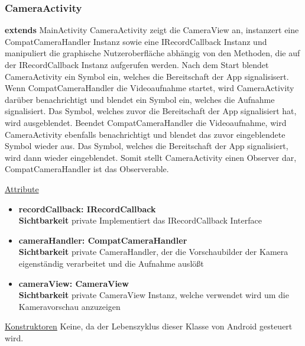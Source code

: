 \subsubsection{CameraActivity}
\textbf{extends} MainActivity \newline
CameraActivity zeigt die CameraView an, instanzert eine CompatCameraHandler Instanz sowie eine IRecordCallback Instanz und manipuliert die graphische Nutzeroberfläche abhängig von den Methoden, die auf der IRecordCallback Instanz aufgerufen werden. Nach dem Start blendet CameraActivity ein Symbol ein, welches die Bereitschaft der App signalisisert. Wenn CompatCameraHandler die Videoaufnahme startet, wird CameraActivity darüber benachrichtigt und blendet ein Symbol ein, welches die Aufnahme signalisiert. Das Symbol, welches zuvor die Bereitschaft der App signalisiert hat, wird ausgeblendet. Beendet CompatCameraHandler die Videoaufnahme, wird CameraActivity ebenfalls benachrichtigt und blendet das zuvor eingeblendete Symbol wieder aus. Das Symbol, welches die Bereitschaft der App signalisiert, wird dann wieder eingeblendet. Somit stellt CameraActivity einen Observer dar, CompatCameraHandler ist das Observerable.
\newline

\underline{Attribute}
\begin{itemize}
\itemsep0pt
\item \textbf{recordCallback: IRecordCallback} \hfill\\ 
\textbf{Sichtbarkeit} private\newline
Implementiert das IRecordCallback Interface

\item \textbf{cameraHandler: CompatCameraHandler} \hfill\\ 
\textbf{Sichtbarkeit} private\newline
CameraHandler, der die Vorschaubilder der Kamera eigenständig verarbeitet und die Aufnahme auslößt

\item \textbf{cameraView: CameraView} \hfill\\ 
\textbf{Sichtbarkeit} private\newline
CameraView Instanz, welche verwendet wird um die Kameravorschau anzuzeigen
\end{itemize}

\underline{Konstruktoren}\newline
\indent Keine, da der Lebenszyklus dieser Klasse von Android gesteuert wird.\newline

